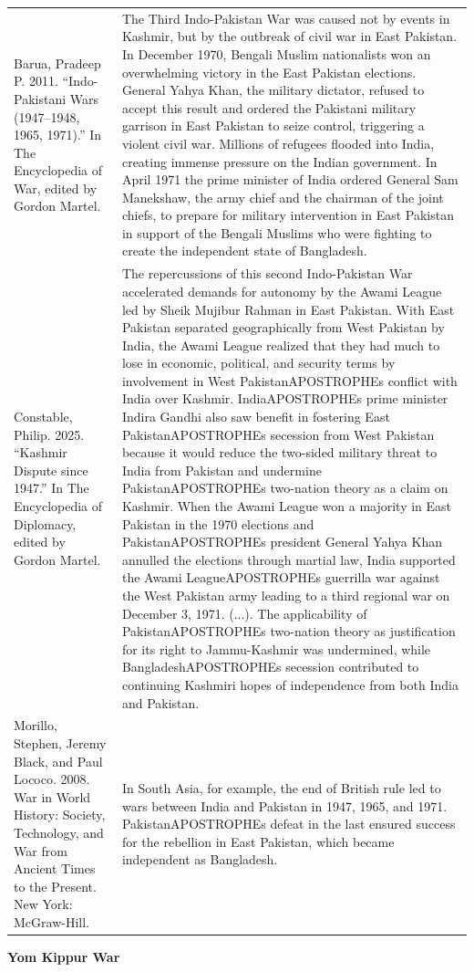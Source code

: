 {\begin{longtable}{p{}p{}}
\\
Barua, Pradeep P. 2011. “Indo-Pakistani Wars (1947–1948, 1965, 1971).” In The Encyclopedia of War, edited by Gordon Martel. & The Third Indo-Pakistan War was caused not by events in Kashmir, but by the outbreak of civil war in East Pakistan. In December 1970, Bengali Muslim nationalists won an overwhelming victory in the East Pakistan elections. General Yahya Khan, the military dictator, refused to accept this result and ordered the Pakistani military garrison in East Pakistan to seize control, triggering a violent civil war. Millions of refugees flooded into India, creating immense pressure on the Indian government. In April 1971 the prime minister of India ordered General Sam Manekshaw, the army chief and the chairman of the joint chiefs, to prepare for military intervention in East Pakistan in support of the Bengali Muslims who were fighting to create the independent state of Bangladesh.
\\
Constable, Philip. 2025. “Kashmir Dispute since 1947.” In The Encyclopedia of Diplomacy, edited by Gordon Martel. & The repercussions of this second Indo-Pakistan War accelerated demands for autonomy by the Awami League led by Sheik Mujibur Rahman in East Pakistan. With East Pakistan separated geographically from West Pakistan by India, the Awami League realized that they had much to lose in economic, political, and security terms by involvement in West PakistanAPOSTROPHEs conflict with India over Kashmir. IndiaAPOSTROPHEs prime minister Indira Gandhi also saw benefit in fostering East PakistanAPOSTROPHEs secession from West Pakistan because it would reduce the two-sided military threat to India from Pakistan and undermine PakistanAPOSTROPHEs two-nation theory as a claim on Kashmir. When the Awami League won a majority in East Pakistan in the 1970 elections and PakistanAPOSTROPHEs president General Yahya Khan annulled the elections through martial law, India supported the Awami LeagueAPOSTROPHEs guerrilla war against the West Pakistan army leading to a third regional war on December 3, 1971. (...). The applicability of PakistanAPOSTROPHEs two-nation theory as justification for its right to Jammu-Kashmir was undermined, while BangladeshAPOSTROPHEs secession contributed to continuing Kashmiri hopes of independence from both India and Pakistan.
\\
Morillo, Stephen, Jeremy Black, and Paul Lococo. 2008. War in World History: Society, Technology, and War from Ancient Times to the Present. New York: McGraw-Hill. & In South Asia, for example, the end of British rule led to wars between India and Pakistan in 1947, 1965, and 1971. PakistanAPOSTROPHEs defeat in the last ensured success for the rebellion in East Pakistan, which became independent as Bangladesh.
\\
\end{longtable}}
\clearpage
         \textbf{Yom Kippur War} 

